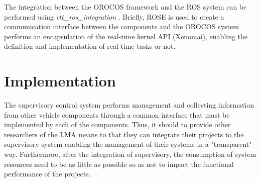 \documentclass[conference]{IEEEtran}
\begin{document}
The integration between the OROCOS framework and the ROS system can be performed using \textit{rtt\_ros\_integration} \cite{rtt_ros_integration}. Briefly, ROSE is used to create a communication interface between the components and the OROCOS system performs an encapsulation of the real-time kernel API (Xenomai), enabling the definition and implementation of real-time tasks or not.


%	
%	
%	

\section{Implementation}\label{sec:implementation}

The supervisory control system performs management and collecting information from other vehicle components through a common interface that must be implemented by each of the components. Thus, it should to provide other researchers of the LMA means to that they can integrate their projects to the supervisory system enabling the management of their systems in a "transparent" way. Furthermore, after the integration of supervisory, the consumption of system resources need to be as little as possible so as not to impact the functional performance of the projects.
\end{document}
